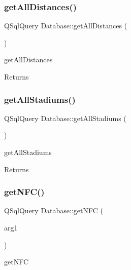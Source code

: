\subsubsection{\texorpdfstring{get\+All\+Distances()}{getAllDistances()}}
{\footnotesize\ttfamily Q\+Sql\+Query Database\+::get\+All\+Distances (\begin{DoxyParamCaption}{ }\end{DoxyParamCaption})}



get\+All\+Distances 

\begin{DoxyReturn}{Returns}

\end{DoxyReturn}
\mbox{\label{class_database_a36269f6c3e0e78bbea4baecaa98f2502}} 
\subsubsection{\texorpdfstring{get\+All\+Stadiums()}{getAllStadiums()}}
{\footnotesize\ttfamily Q\+Sql\+Query Database\+::get\+All\+Stadiums (\begin{DoxyParamCaption}{ }\end{DoxyParamCaption})}



get\+All\+Stadiums 

\begin{DoxyReturn}{Returns}

\end{DoxyReturn}
\mbox{\label{class_database_a7e2501d41331a1829a13349256cb1cda}} 
\subsubsection{\texorpdfstring{get\+N\+F\+C()}{getNFC()}}
{\footnotesize\ttfamily Q\+Sql\+Query Database\+::get\+N\+FC (\begin{DoxyParamCaption}\item[{const Q\+String \&}]{arg1 }\end{DoxyParamCaption})}



get\+N\+FC 


